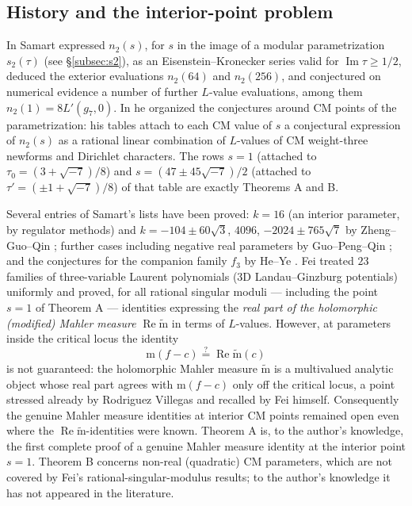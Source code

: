 \documentclass[11pt]{article}
\theoremstyle{definition}
\theoremstyle{remark}
\newcommand{\ImT}{\operatorname{Im}}
\newcommand{\ReT}{\operatorname{Re}}
\newcommand{\m}{\mathrm{m}}
\newcommand{\mt}{\widetilde{\m}}
\begin{document}
\subsection{History and the interior-point problem}\label{subsec:history}

In \cite{Sa13} Samart expressed $n_2(s)$, for $s$ in the image of a modular
parametrization $s_2(\tau)$ (see \S\ref{subsec:s2}), as an
Eisenstein--Kronecker series valid for $\ImT\tau\ge1/2$, deduced the
exterior evaluations $n_2(64)$ and $n_2(256)$, and conjectured on
numerical evidence a number of further $L$-value evaluations, among them
$n_2(1)=8L'(g_7,0)$. In \cite{Sa15} he organized the conjectures around
CM points of the parametrization: his tables attach to each CM value of
$s$ a conjectural expression of $n_2(s)$ as a rational linear combination
of $L$-values of CM weight-three newforms and Dirichlet characters. The
rows $s=1$ (attached to $\tau_0=(3+\sqrt{-7})/8$) and
$s=(47\pm45\sqrt{-7})/2$ (attached to $\tau'=(\pm1+\sqrt{-7})/8$) of that
table are exactly Theorems A and B.

Several entries of Samart's lists have been proved: $k=16$ (an interior
parameter, by regulator methods) and $k=-104\pm60\sqrt3$, $4096$,
$-2024\pm765\sqrt7$ by Zheng--Guo--Qin \cite{ZGQ}; further cases including
negative real parameters by Guo--Peng--Qin \cite{GPQ}; and the conjectures
for the companion family $f_3$ by He--Ye \cite{HY}. Fei \cite{Fe} treated
$23$ families of three-variable Laurent polynomials (3D Landau--Ginzburg
potentials) uniformly and proved, for all rational singular moduli ---
including the point $s=1$ of Theorem A --- identities expressing the
\emph{real part of the holomorphic (modified) Mahler measure} $\ReT\mt$
in terms of $L$-values. However, at parameters inside the critical locus
the identity
\[
  \m(f-c)\stackrel{?}{=}\ReT\mt(c)
\]
is not guaranteed: the holomorphic Mahler measure $\mt$ is a multivalued
analytic object whose real part agrees with $\m(f-c)$ only off the
critical locus, a point stressed already by Rodriguez Villegas \cite{RV}
and recalled by Fei himself. Consequently the genuine Mahler measure
identities at interior CM points remained open even where the
$\ReT\mt$-identities were known. Theorem A is, to the author's
knowledge, the first
complete proof of a genuine Mahler measure identity at the interior point
$s=1$. Theorem B concerns non-real (quadratic) CM parameters, which are
not covered by Fei's rational-singular-modulus results; to the author's
knowledge it has not appeared in the literature.
\end{document}
